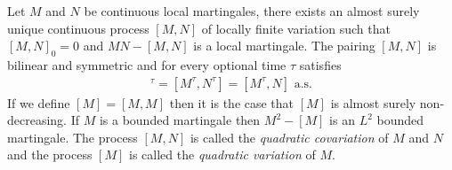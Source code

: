 \begin{thm}\label{OptionalQuadraticCovariation}Let $M$ and $N$ be continuous local martingales, there exists an almost surely unique continuous process $[M,N]$ of locally finite variation such that $[M,N]_0 = 0$ and $MN - [M,N]$ is a local martingale.  The pairing $[M,N]$ is bilinear and symmetric and for every optional time $\tau$ satisfies
\begin{align*}
[M,N]^\tau = [M^\tau, N^\tau] = [M^\tau, N] \text{ a.s.}
\end{align*}
If we define $[M] = [M,M]$ then it is the case that $[M]$ is almost surely non-decreasing.  If $M$ is a bounded martingale then $M^2 - [M]$ is an $L^2$ bounded martingale.  The process $[M,N]$ is called the \emph{quadratic covariation} of $M$ and $N$ and the process $[M]$ is called the \emph{quadratic variation} of $M$.
\end{thm}

